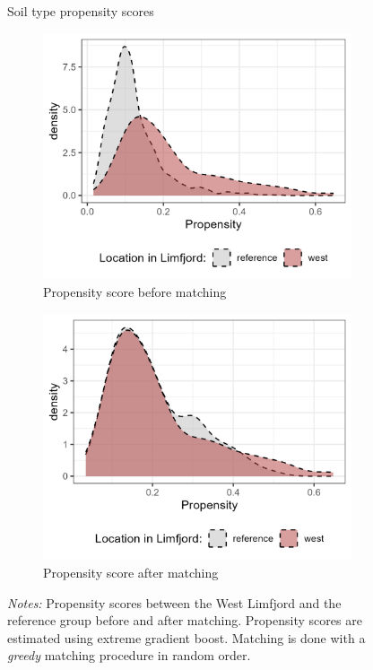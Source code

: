 \documentclass[11pt]{article}
\begin{document}
\begin{figure}
    \centering
    \caption{Soil type propensity scores}
    \begin{subfigure}[b]{0.45\textwidth}
        \centering
        \caption{Propensity score before matching} \label{fig:prop1}
        \includegraphics[width=\textwidth]{Plots/Propensity_before.png}
    \end{subfigure}
    \hfill
    \begin{subfigure}[b]{0.45\textwidth}
        \centering
        \caption{Propensity score after matching} \label{fig:prop2}
        \includegraphics[width=\textwidth]{Plots/Propensity_after.png}
    \end{subfigure}
    \parbox{0.9\textwidth}{
    \caption*{\footnotesize \textit{Notes:} Propensity scores between the West Limfjord and the reference group before and after matching. Propensity scores are estimated using extreme gradient boost. Matching is done with a \textit{greedy} matching procedure in random order.}
}
    \label{fig:prop_score}
\end{figure}
\end{document}
